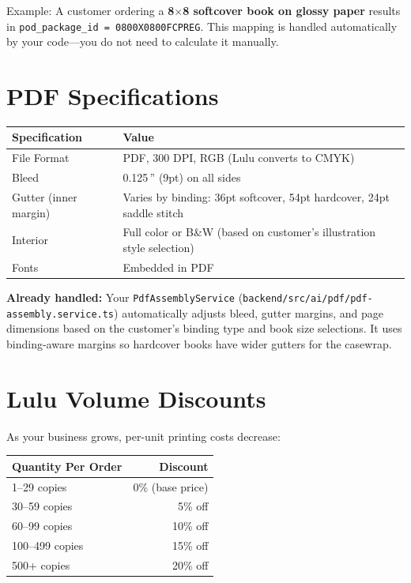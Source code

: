 \documentclass[12pt, letterpaper, oneside]{book}
\begin{document}
\noindent Example: A customer ordering a \textbf{8$\times$8 softcover book on glossy paper} results in \texttt{pod\_package\_id = 0800X0800FCPREG}. This mapping is handled automatically by your code---you do not need to calculate it manually.

\section{PDF Specifications}

\begin{table}[H]
\centering
\begin{tabularx}{\textwidth}{lX}
\toprule
\textbf{Specification} & \textbf{Value} \\
\midrule
File Format & PDF, 300 DPI, RGB (Lulu converts to CMYK) \\
Bleed & 0.125\,'' (9pt) on all sides \\
Gutter (inner margin) & Varies by binding: 36pt softcover, 54pt hardcover, 24pt saddle stitch \\
Interior & Full color or B\&W (based on customer's illustration style selection) \\
Fonts & Embedded in PDF \\
\bottomrule
\end{tabularx}
\end{table}

\begin{infobox}
\textbf{Already handled:} Your \texttt{PdfAssemblyService} (\texttt{backend/src/ai/pdf/pdf-assembly.service.ts}) automatically adjusts bleed, gutter margins, and page dimensions based on the customer's binding type and book size selections. It uses binding-aware margins so hardcover books have wider gutters for the casewrap.
\end{infobox}

\section{Lulu Volume Discounts}

As your business grows, per-unit printing costs decrease:

\begin{table}[H]
\centering
\begin{tabular}{lr}
\toprule
\textbf{Quantity Per Order} & \textbf{Discount} \\
\midrule
1--29 copies & 0\% (base price) \\
30--59 copies & 5\% off \\
60--99 copies & 10\% off \\
100--499 copies & 15\% off \\
500+ copies & 20\% off \\
\bottomrule
\end{tabular}
\end{table}
\end{document}
